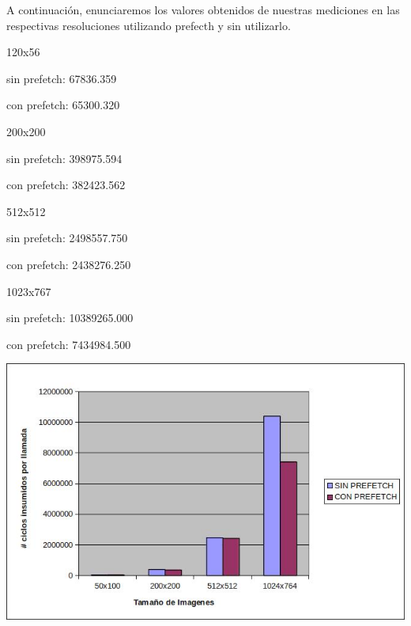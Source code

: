   A continuación, enunciaremos los valores obtenidos de nuestras mediciones en las respectivas resoluciones
  utilizando prefecth y sin utilizarlo.\vspace*{0.3cm} \noindent
  
  \vspace*{0.3cm} \noindent
  \vspace*{0.3cm} \noindent
120x56

\vspace*{0.1cm} \noindent

sin prefetch: 67836.359

con prefetch: 65300.320

\vspace*{0.3cm} \noindent
200x200
\vspace*{0.1cm} \noindent

sin prefetch: 398975.594

con prefetch: 382423.562

\vspace*{0.3cm} \noindent
512x512

\vspace*{0.1cm} \noindent

sin prefetch: 2498557.750

con prefetch: 2438276.250

\vspace*{0.3cm} \noindent
1023x767

\vspace*{0.1cm} \noindent

sin prefetch: 10389265.000

con prefetch: 7434984.500

\vspace*{0.3cm} \noindent

 \begin{center}
 \includegraphics[scale=0.7]{popart3.jpg}
 \end{center}
  \vspace*{0.3cm} 
  
